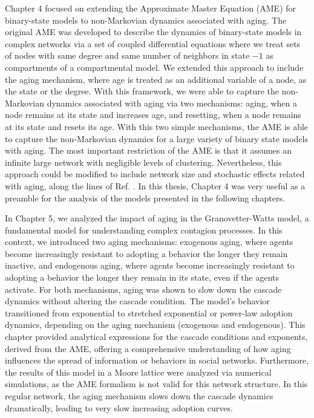 Chapter 4 focused on extending the Approximate Master Equation (AME) for binary-state models to non-Markovian dynamics associated with aging. The original AME was developed to describe the dynamics of binary-state models in complex networks via a set of coupled differential equations where we treat sets of nodes with same degree and same number of neighbors in state $-1$ as compartments of a compartmental model. We extended this approach to include the aging mechanism, where age is treated as an additional variable of a node, as the state or the degree. With this framework, we were able to capture the non-Markovian dynamics associated with aging via two mechanisms: aging, when a node remains at its state and increases age, and resetting, when a node remains at its state and resets its age. With this two simple mechanisms, the AME is able to capture the non-Markovian dynamics for a large variety of binary state models with aging. The most important restriction of the AME is that it assumes an infinite large network with negligible levels of clustering. Nevertheless, this approach could be modified to include network size and stochastic effects related with aging, along the lines of Ref. \cite{peralta-2020B}. In this thesis, Chapter 4 was very useful as a preamble for the analysis of the models presented in the following chapters.

In Chapter 5, we analyzed the impact of aging in the Granovetter-Watts model, a fundamental model for understanding complex contagion processes. In this context, we introduced two aging mechanisms: exogenous aging, where agents become increasingly resistant to adopting a behavior the longer they remain inactive, and endogenous aging, where agents become increasingly resistant to adopting a behavior the longer they remain in its state, even if the agents activate. For both mechanisms, aging was shown to slow down the cascade dynamics without altering the cascade condition. The model's behavior transitioned from exponential to stretched exponential or power-law adoption dynamics, depending on the aging mechanism (exogenous and endogenous). This chapter provided analytical expressions for the cascade conditions and exponents, derived from the AME, offering a comprehensive understanding of how aging influences the spread of information or behaviors in social networks. Furthermore, the results of this model in a Moore lattice were analyzed via numerical simulations, as the AME formalism is not valid for this network structure. In this regular network, the aging mechanism slows down the cascade dynamics dramatically, leading to very slow increasing adoption curves.

